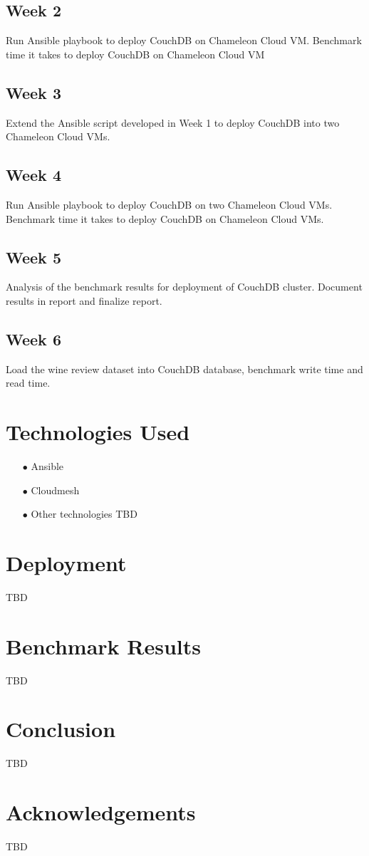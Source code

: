 \subsection{Week 2}

Run Ansible playbook to deploy CouchDB on Chameleon Cloud
VM. Benchmark time it takes to deploy CouchDB on Chameleon Cloud VM

\subsection{Week 3}

Extend the Ansible script developed in Week 1 to deploy CouchDB into
two Chameleon Cloud VMs.

\subsection{Week 4}

Run Ansible playbook to deploy CouchDB on two Chameleon Cloud
VMs. Benchmark time it takes to deploy CouchDB on Chameleon Cloud VMs.

\subsection{Week 5}

Analysis of the benchmark results for deployment of CouchDB
cluster. Document results in report and finalize report.

\subsection{Week 6}

Load the wine review dataset into CouchDB database, benchmark write time
and read time.
\section{Technologies Used}
\begin{itemize}
\item[$\bullet$] Ansible
\item[$\bullet$] Cloudmesh
\item[$\bullet$] Other technologies TBD
\end{itemize}

\section{Deployment}
TBD

\section{Benchmark Results}
TBD

\section{Conclusion}
TBD
\section*{Acknowledgements}

TBD


 






